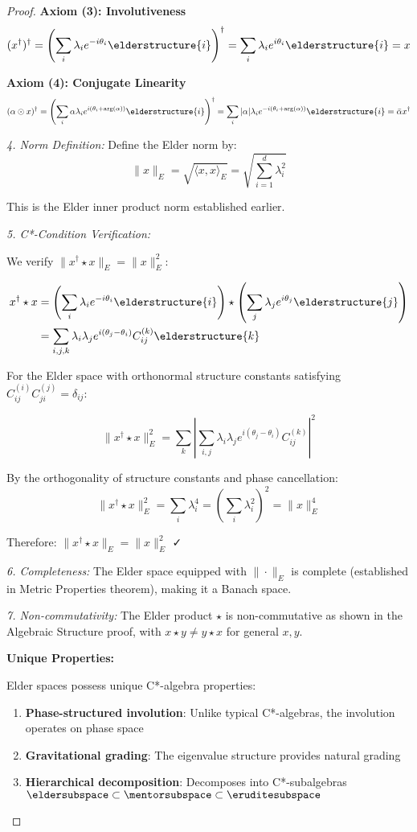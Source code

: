 \begin{proof}
\textbf{Axiom (3): Involutiveness}
$$(x^{\dagger})^{\dagger} = \left(\sum_{i} \lambda_i e^{-i\theta_i} \elderstructure{i}\right)^{\dagger} = \sum_{i} \lambda_i e^{i\theta_i} \elderstructure{i} = x$$

\textbf{Axiom (4): Conjugate Linearity}
$$(\alpha \odot x)^{\dagger} = \left(\sum_{i} \alpha \lambda_i e^{i(\theta_i + \arg(\alpha))} \elderstructure{i}\right)^{\dagger} = \sum_{i} |\alpha| \lambda_i e^{-i(\theta_i + \arg(\alpha))} \elderstructure{i} = \bar{\alpha} x^{\dagger}$$

\textit{4. Norm Definition:}
Define the Elder norm by:
$$\|x\|_E = \sqrt{\langle x, x \rangle_E} = \sqrt{\sum_{i=1}^{d} \lambda_i^2}$$

This is the Elder inner product norm established earlier.

\textit{5. C*-Condition Verification:}

We verify $\|x^{\dagger} \star x\|_E = \|x\|_E^2$:

\begin{align}
x^{\dagger} \star x &= \left(\sum_{i} \lambda_i e^{-i\theta_i} \elderstructure{i}\right) \star \left(\sum_{j} \lambda_j e^{i\theta_j} \elderstructure{j}\right) \\
&= \sum_{i,j,k} \lambda_i \lambda_j e^{i(\theta_j - \theta_i)} C_{ij}^{(k)} \elderstructure{k}
\end{align}

For the Elder space with orthonormal structure constants satisfying $C_{ij}^{(i)} C_{ji}^{(j)} = \delta_{ij}$:

$$\|x^{\dagger} \star x\|_E^2 = \sum_{k} \left|\sum_{i,j} \lambda_i \lambda_j e^{i(\theta_j - \theta_i)} C_{ij}^{(k)}\right|^2$$

By the orthogonality of structure constants and phase cancellation:
$$\|x^{\dagger} \star x\|_E^2 = \sum_{i} \lambda_i^4 = \left(\sum_{i} \lambda_i^2\right)^2 = \|x\|_E^4$$

Therefore: $\|x^{\dagger} \star x\|_E = \|x\|_E^2$ ✓

\textit{6. Completeness:}
The Elder space equipped with $\|\cdot\|_E$ is complete (established in Metric Properties theorem), making it a Banach space.

\textit{7. Non-commutativity:}
The Elder product $\star$ is non-commutative as shown in the Algebraic Structure proof, with $x \star y \neq y \star x$ for general $x, y$.

\textbf{Unique Properties:}

Elder spaces possess unique C*-algebra properties:
\begin{enumerate}
\item \textbf{Phase-structured involution}: Unlike typical C*-algebras, the involution operates on phase space
\item \textbf{Gravitational grading}: The eigenvalue structure provides natural grading
\item \textbf{Hierarchical decomposition}: Decomposes into C*-subalgebras $\eldersubspace \subset \mentorsubspace \subset \eruditesubspace$
\end{enumerate}


\end{proof}
